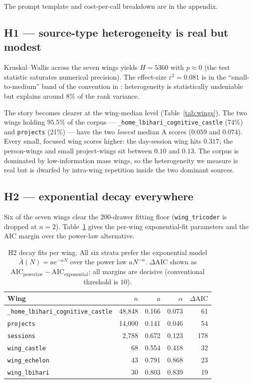 \documentclass[11pt]{article}
\begin{document}
The prompt template and cost-per-call breakdown are in the appendix.

\subsection{H1 --- source-type heterogeneity is real but modest}
Kruskal--Wallis across the seven wings yields $H = 5360$ with $p \approx
0$ (the test statistic saturates numerical precision). The
effect-size $\varepsilon^2 = 0.081$ is in the ``small-to-medium'' band
of the convention in \citet{tomczak2014epsilon}: heterogeneity is
statistically undeniable but explains around $8\%$ of the rank
variance.

The story becomes clearer at the wing-median level
(Table~\ref{tab:wings}). The two wings holding $95.5\%$ of the corpus
--- \texttt{\_home\_lbihari\_cognitive\_castle} (74\%) and
\texttt{projects} (21\%) --- have the two \emph{lowest} median A
scores ($0.059$ and $0.074$). Every small, focused wing scores higher:
the day-session wing hits $0.317$; the person-wings and small
project-wings sit between $0.10$ and $0.13$. The corpus is dominated by
low-information mass wings, so the heterogeneity we measure is real but
is dwarfed by intra-wing repetition inside the two dominant sources.

\subsection{H2 --- exponential decay everywhere}
Six of the seven wings clear the 200-drawer fitting floor
(\texttt{wing\_tricoder} is dropped at $n = 2$). Table~\ref{tab:decay}
gives the per-wing exponential-fit parameters and the AIC margin over
the power-law alternative.

\begin{table}[h]
\centering
\begin{tabular}{lrrrr}
\toprule
Wing & $n$ & $a$ & $\alpha$ & $\Delta \mathrm{AIC}$ \\
\midrule
\texttt{\_home\_lbihari\_cognitive\_castle} & 48{,}848 & 0.166 & 0.073 & 61 \\
\texttt{projects}                            & 14{,}000 & 0.141 & 0.046 & 54 \\
\texttt{sessions}                            &  2{,}788 & 0.672 & 0.123 & 178 \\
\texttt{wing\_castle}                        &     68 & 0.554 & 0.418 & 32 \\
\texttt{wing\_echelon}                       &     43 & 0.791 & 0.868 & 23 \\
\texttt{wing\_lbihari}                       &     30 & 0.803 & 0.839 & 19 \\
\bottomrule
\end{tabular}
\caption{H2 decay fits per wing. All six strata prefer the exponential
model $\bar{A}(N) = a e^{-\alpha N}$ over the power law $a N^{-\alpha}$.
$\Delta \mathrm{AIC}$ shown as $\mathrm{AIC}_{\text{powerlaw}} -
\mathrm{AIC}_{\text{exponential}}$; all margins are decisive
(conventional threshold is $10$).}
\label{tab:decay}
\end{table}
\end{document}
